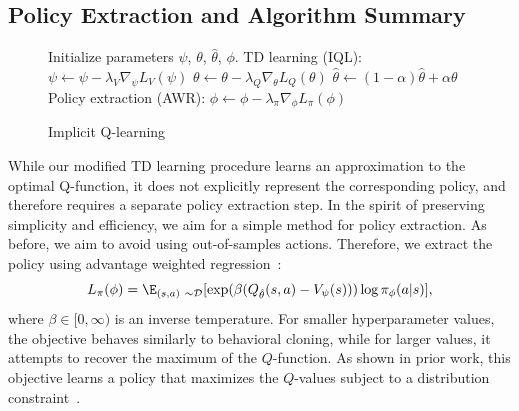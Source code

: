 \documentclass{article} %
\begin{document}
\subsection{Policy Extraction and Algorithm Summary}

\begin{figure}
    \begin{minipage}{0.35\textwidth}
        \begin{algorithm}[H]
            \caption{Implicit Q-learning}
            \begin{algorithmic}
            \label{alg:iql}
                \State Initialize parameters $\psi$, $\theta$, $\hat{\theta}$, $\phi$.
                \State TD learning (IQL):
                \State $\psi \leftarrow \psi - \lambda_V \nabla_\psi L_V(\psi)$ 
                \State $\theta \leftarrow \theta - \lambda_Q \nabla_{\theta} L_Q(\theta)$
                \State $\hat{\theta} \leftarrow (1-\alpha)\hat{\theta} + \alpha\theta$
                \EndFor
                \State Policy extraction (AWR):
                \State $\phi \leftarrow \phi - \lambda_\pi \nabla_\phi L_\pi(\phi)$
                \EndFor
            \end{algorithmic}
        \end{algorithm}
    \end{minipage}
\end{figure}

While our modified TD learning procedure learns an approximation to the optimal Q-function, it does not explicitly represent the corresponding policy, and therefore requires a separate policy extraction step. In the spirit of preserving simplicity and efficiency, we aim for a simple method for policy extraction. As before, we aim to avoid using out-of-samples actions. Therefore, we extract the policy using advantage weighted regression~\citep{peters2007reinforcement,wang2018exponentially,peng2019advantage,nair2020awac}:
\begin{equation}
    L_\pi(\phi) = \E_{(s,a)~\sim \D}[\exp(\beta(Q_{\hat{\theta}}(s,a) - V_\psi(s)))\log \pi_\phi(a|s)],
    \label{eqn:awr}
\end{equation}
where $\beta \in [0, \infty)$  is an inverse temperature. For smaller hyperparameter values, the objective behaves similarly to behavioral cloning, while for larger values, it attempts to recover the maximum of the $Q$-function.
As shown in prior work, this objective learns a policy that maximizes the $Q$-values subject to a distribution constraint~\citep{peters2007reinforcement,peng2019advantage,nair2020awac}.
\end{document}
